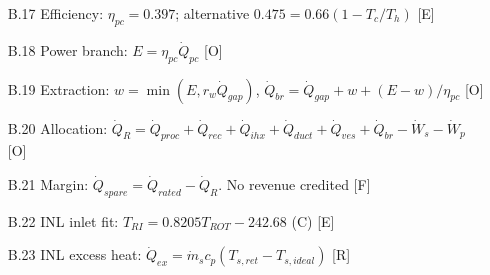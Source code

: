 \begin{enumerate}[leftmargin=1.4cm,itemsep=0pt,topsep=2pt,parsep=0pt]
\item[B.17] Efficiency: $\eta_{pc}=0.397$; alternative $0.475=0.66(1-T_c/T_h)$ {\footnotesize [E]}
\item[B.18] Power branch: $E=\eta_{pc}\dot Q_{pc}$ {\footnotesize [O]}
\item[B.19] Extraction: $w=\min(E,r_w\dot Q_{gap})$, $\dot Q_{br}=\dot Q_{gap}+w+(E-w)/\eta_{pc}$ {\footnotesize [O]}
\item[B.20] Allocation: $\dot Q_R=\dot Q_{proc}+\dot Q_{rec}+\dot Q_{ihx}+\dot Q_{duct}+\dot Q_{ves}+\dot Q_{br}-\dot W_s-\dot W_p$ {\footnotesize [O]}
\item[B.21] Margin: $\dot Q_{spare}=\dot Q_{rated}-\dot Q_R$. No revenue credited {\footnotesize [F]}
\item[B.22] INL inlet fit: $T_{RI}=0.8205T_{ROT}-242.68$ (C) {\footnotesize [E]}
\item[B.23] INL excess heat: $\dot Q_{ex}=\dot m_sc_p(T_{s,ret}-T_{s,ideal})$ {\footnotesize [R]}
\end{enumerate}
